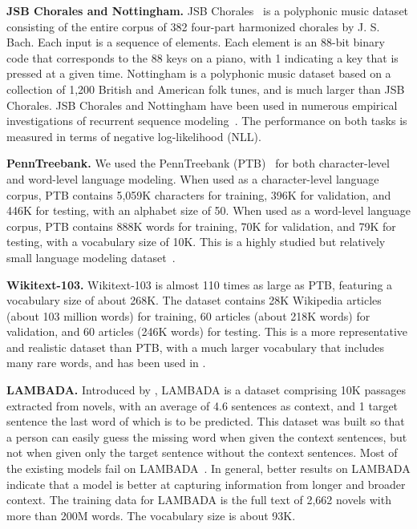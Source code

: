\documentclass{article}
\newcommand\mypara[1]{\vspace{0mm}\noindent\textbf{#1}}
\begin{document}
\mypara{JSB Chorales and Nottingham.} JSB Chorales~\citep{allan2005harmonising} is a
polyphonic music dataset consisting of the entire corpus of 382 four-part
harmonized chorales by J. S. Bach. Each input is a sequence of elements. Each element is an 88-bit binary code that corresponds to the 88 keys on a
piano, with 1 indicating a key that is pressed at a given time.
Nottingham is a polyphonic music dataset based on a collection of 1,200 British and American folk tunes, and is much larger than JSB Chorales. JSB Chorales and Nottingham have been used in numerous empirical investigations of recurrent sequence modeling~\citep{chung2014empirical,Pascanu2014:ICLR,jozefowicz2015empirical,greffOdyssey}. The performance on both tasks is measured in terms of negative log-likelihood (NLL).

\mypara{PennTreebank.} We used the PennTreebank (PTB)~\citep{Marcus93buildinga} for both
character-level and word-level language modeling. When used as a character-level language corpus,
PTB contains 5,059K characters for training, 396K for validation, and 446K for testing, with an
alphabet size of 50. When used as a word-level language corpus, PTB contains
888K words for training, 70K for validation, and 79K for testing, with a vocabulary size of 10K.
This is a highly studied but relatively small language modeling
dataset~\citep{miyamoto2016gated,kruegerZoneout,merityRegOpt}.

\mypara{Wikitext-103.} Wikitext-103 \citep{merity2016pointer} is almost 110
times as large as PTB, featuring a vocabulary size of about 268K.  The dataset
contains 28K Wikipedia articles (about 103 million words) for training, 60
articles (about 218K words) for validation, and 60 articles (246K words) for
testing. This is a more representative and realistic dataset than PTB, with a much
larger vocabulary that includes many rare words, and has been used in
\citet{merity2016pointer, grave2016improving, dauphinGatedConv}.

\mypara{LAMBADA.} Introduced by \citet{paperno2016lambada}, LAMBADA is a dataset
comprising 10K passages extracted from novels, with an average of 4.6 sentences
as context, and 1 target sentence the last word of which is to be predicted. This
dataset was built so that a person can easily guess the missing word when given the
context sentences, but not when given only the target sentence without the context sentences. Most of the
existing models fail on LAMBADA~\cite{paperno2016lambada, grave2016improving}. In general, better results on LAMBADA
indicate that a model is better at capturing information from longer and broader
context. The training data for LAMBADA is the full text of 2,662 novels with more
than 200M words. The vocabulary size is about 93K.
\end{document}
